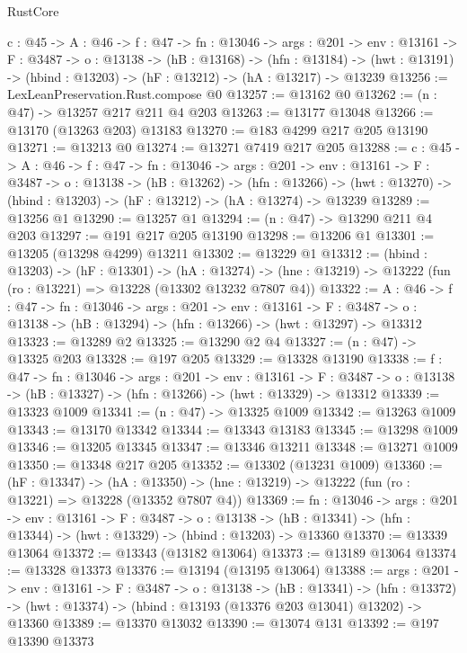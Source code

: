 \begin{lexlean}{RustCore}
\begin{coremodule}
  {c : @45} ->
  {A : @46} ->
  {f : @47} ->
  {fn : @13046} ->
  {args : @201} ->
  {env : @13161} ->
  {F : @3487} ->
  {o : @13138} ->
  (hB : @13168) ->
  (hfn : @13184) -> (hwt : @13191) -> (hbind : @13203) -> (hF : @13212) -> (hA : @13217) -> @13239
@13256 := LexLeanPreservation.Rust.compose @0
@13257 := @13162 @0
@13262 := (n : @47) -> @13257 @217 @211 @4 @203
@13263 := @13177 @13048
@13266 := @13170 (@13263 @203) @13183
@13270 := @183 @4299 @217 @205 @13190
@13271 := @13213 @0
@13274 := @13271 @7419 @217 @205
@13288 := {c : @45} ->
  {A : @46} ->
  {f : @47} ->
  {fn : @13046} ->
  {args : @201} ->
  {env : @13161} ->
  {F : @3487} ->
  {o : @13138} ->
  (hB : @13262) ->
  (hfn : @13266) -> (hwt : @13270) -> (hbind : @13203) -> (hF : @13212) -> (hA : @13274) -> @13239
@13289 := @13256 @1
@13290 := @13257 @1
@13294 := (n : @47) -> @13290 @211 @4 @203
@13297 := @191 @217 @205 @13190
@13298 := @13206 @1
@13301 := @13205 (@13298 @4299) @13211
@13302 := @13229 @1
@13312 := (hbind : @13203) ->
  (hF : @13301) ->
  (hA : @13274) -> (hne : @13219) -> @13222 (fun (ro : @13221) => @13228 (@13302 @13232 @7807 @4))
@13322 := {A : @46} ->
  {f : @47} ->
  {fn : @13046} ->
  {args : @201} ->
  {env : @13161} ->
  {F : @3487} -> {o : @13138} -> (hB : @13294) -> (hfn : @13266) -> (hwt : @13297) -> @13312
@13323 := @13289 @2
@13325 := @13290 @2 @4
@13327 := (n : @47) -> @13325 @203
@13328 := @197 @205
@13329 := @13328 @13190
@13338 := {f : @47} ->
  {fn : @13046} ->
  {args : @201} ->
  {env : @13161} ->
  {F : @3487} -> {o : @13138} -> (hB : @13327) -> (hfn : @13266) -> (hwt : @13329) -> @13312
@13339 := @13323 @1009
@13341 := (n : @47) -> @13325 @1009
@13342 := @13263 @1009
@13343 := @13170 @13342
@13344 := @13343 @13183
@13345 := @13298 @1009
@13346 := @13205 @13345
@13347 := @13346 @13211
@13348 := @13271 @1009
@13350 := @13348 @217 @205
@13352 := @13302 (@13231 @1009)
@13360 := (hF : @13347) ->
  (hA : @13350) -> (hne : @13219) -> @13222 (fun (ro : @13221) => @13228 (@13352 @7807 @4))
@13369 := {fn : @13046} ->
  {args : @201} ->
  {env : @13161} ->
  {F : @3487} ->
  {o : @13138} -> (hB : @13341) -> (hfn : @13344) -> (hwt : @13329) -> (hbind : @13203) -> @13360
@13370 := @13339 @13064
@13372 := @13343 (@13182 @13064)
@13373 := @13189 @13064
@13374 := @13328 @13373
@13376 := @13194 (@13195 @13064)
@13388 := {args : @201} ->
  {env : @13161} ->
  {F : @3487} ->
  {o : @13138} ->
  (hB : @13341) ->
  (hfn : @13372) -> (hwt : @13374) -> (hbind : @13193 (@13376 @203 @13041) @13202) -> @13360
@13389 := @13370 @13032
@13390 := @13074 @131
@13392 := @197 @13390 @13373

\end{coremodule}
\end{lexlean}
